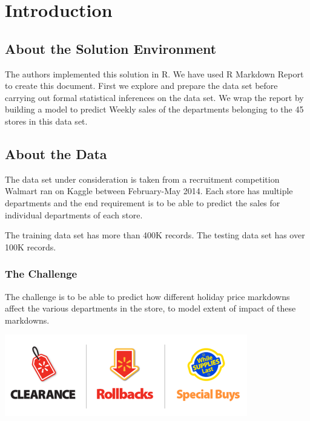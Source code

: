 \documentclass[]{article}
\begin{document}
\pagebreak
\hfill \break
\hfill \break
\hfill \break
\hfill \break
\hfill \break
\hfill \break
\hfill \break
\hfill \break
\hfill \break
\hfill \break
\hfill \break
\hfill \break
\hfill \break
\hfill \break
\hfill \break
\hfill \break
\hfill \break
\hfill \break
\hfill \break
\hfill \break
\graphicspath{ {Images/} }

\section{Introduction}\label{introduction}

\subsection{About the Solution
Environment}\label{about-the-solution-environment}

The authors implemented this solution in R. We have used R Markdown
Report to create this document. First we explore and prepare the data
set before carrying out formal statistical inferences on the data set.
We wrap the report by building a model to predict Weekly sales of the
departments belonging to the 45 stores in this data set.

\subsection{About the Data}\label{about-the-data}

The data set under consideration is taken from a recruitment competition
Walmart ran on Kaggle between February-May 2014. Each store has multiple
departments and the end requirement is to be able to predict the sales
for individual departments of each store.

The training data set has more than 400K records. The testing data set
has over 100K records.

\subsubsection{The Challenge}\label{the-challenge}

The challenge is to be able to predict how different holiday price
markdowns affect the various departments in the store, to model extent
of impact of these markdowns.

\includegraphics{markdowns}
\end{document}
